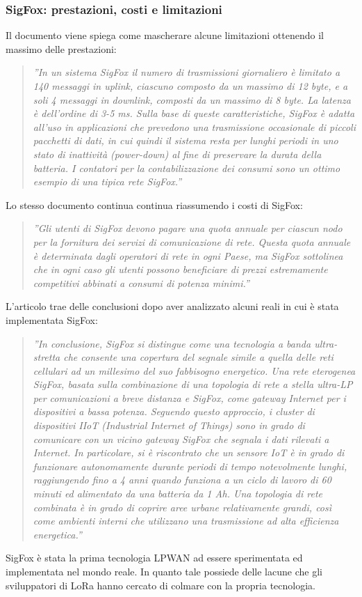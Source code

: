 \documentclass[a4paper]{report} %
\begin{document}
\subsubsection{SigFox: prestazioni, costi e limitazioni}
Il documento \cite{art:rif.23} viene spiega come mascherare alcune limitazioni ottenendo il massimo delle prestazioni:
\begin{quote}
	\textit{''In un sistema SigFox il numero di trasmissioni giornaliero è limitato a 140 messaggi in uplink, ciascuno composto da un massimo di 12 byte, e a soli 4 messaggi in downlink, composti da un massimo di 8 byte. La latenza è dell'ordine di 3-5 ms. Sulla base di queste caratteristiche, SigFox è adatta all'uso in applicazioni che prevedono una trasmissione occasionale di piccoli pacchetti di dati, in cui quindi il sistema resta per lunghi periodi in uno stato di inattività (power-down) al fine di preservare la durata della batteria. I contatori per la contabilizzazione dei consumi sono un ottimo esempio di una tipica rete SigFox.''}
\end{quote}
Lo stesso documento continua continua riassumendo i costi di SigFox:
\begin{quote}
	\textit{''Gli utenti di SigFox devono pagare una quota annuale per ciascun nodo per la fornitura dei servizi di comunicazione di rete. Questa quota annuale è determinata dagli operatori di rete in ogni Paese, ma SigFox sottolinea che in ogni caso gli utenti possono beneficiare di prezzi estremamente competitivi abbinati a consumi di potenza minimi.''}
\end{quote}
L'articolo \cite{art:rif.42} trae delle conclusioni dopo aver analizzato alcuni reali in cui è stata implementata SigFox:
\begin{quote}
	\textit{''In conclusione, SigFox si distingue come una tecnologia a banda ultra-stretta che consente una copertura del segnale simile a quella delle reti cellulari ad un millesimo del suo fabbisogno energetico. Una rete eterogenea SigFox, basata sulla combinazione di una topologia di rete a stella ultra-LP per comunicazioni a breve distanza e SigFox, come gateway Internet per i dispositivi a bassa potenza. Seguendo questo approccio, i cluster di dispositivi IIoT (Industrial Internet of Things) sono in grado di comunicare con un vicino gateway SigFox che segnala i dati rilevati a Internet. In particolare, si è riscontrato che un sensore IoT è in grado di funzionare autonomamente durante periodi di tempo notevolmente lunghi, raggiungendo fino a 4 anni quando funziona a un ciclo di lavoro di 60 minuti ed alimentato da una batteria da 1 Ah. Una topologia di rete combinata è in grado di coprire aree urbane relativamente grandi, così come ambienti interni che utilizzano una trasmissione ad alta efficienza energetica.''} 
\end{quote}
SigFox è stata la prima tecnologia LPWAN ad essere sperimentata ed implementata nel mondo reale. In quanto tale possiede delle lacune che gli sviluppatori di LoRa hanno cercato di colmare con la propria tecnologia. 
\end{document}
